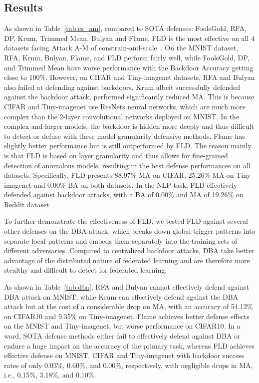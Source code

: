 \subsection{Results}
As shown in Table~\ref{tab:cs_am}, compared to SOTA defenses: FoolsGold, RFA, DP, Krum, Trimmed Mean, Bulyan and Flame, FLD is the most effective on all 4 datasets facing Attack A-M of constrain-and-scale~\cite{howtobackdoor}. On the MNIST dataset, RFA, Krum, Bulyan, Flame, and FLD perform fairly well, while FoolsGold, DP, and Trimmed Mean have worse performance with the Backdoor Accuracy getting close to 100\%. However, on CIFAR and Tiny-imagenet datasets, RFA and Bulyan also failed at defending against backdoors. Krum albeit successfully defended against the backdoor attack, performed significantly reduced MA. This is because CIFAR and Tiny-imagenet use ResNets neural networks, which are much more complex than the 2-layer convolutional networks deployed on MNIST. In the complex and larger models, the backdoor is hidden more deeply and thus difficult to detect or defuse with these model-granularity defensive methods. Flame has slightly better performance but is still outperformed by FLD. The reason mainly is that FLD is based on layer granularity and thus allows for fine-grained detection of anomalous models, resulting in the best defense performances on all datasets. Specifically, FLD presents 88.97\% MA on CIFAR, 25.26\% MA on Tiny-imagenet and 0.00\% BA on both datasets. In the NLP task, FLD effectively defended against backdoor attacks, with a BA of 0.00\% and MA of 19.26\% on Reddit dataset.

To further demonstrate the effectiveness of FLD, we tested FLD against several other defenses on the DBA attack, which breaks down global trigger patterns into separate local patterns and embeds them separately into the training sets of different adversaries. Compared to centralized backdoor attacks, DBA take better advantage of the distributed nature of federated learning and are therefore more stealthy and difficult to detect for federated learning.

As shown in Table~\ref{tab:dba}, RFA and Bulyan cannot effectively defend against DBA attack on MNIST, while Krum can effectively defend against the DBA attack but at the cost of a considerable drop on MA, with an accuracy of 54.12\% on CIFAR10 and 9.35\% on Tiny-imagenet. Flame achieves better defense effects on the MNIST and Tiny-imagenet, but worse performance on CIFAR10. In a word, SOTA defense methods either fail to effectively defend against DBA or endure a huge impact on the accuracy of the primary task, whereas FLD achieves effective defense on MNIST, CIFAR and Tiny-imagenet with backdoor success rates of only 0.03\%, 0.60\%, and 0.00\%, respectively, with negligible drops in MA, i.e., 0.15\%, 3.18\%, and 0.10\%.



